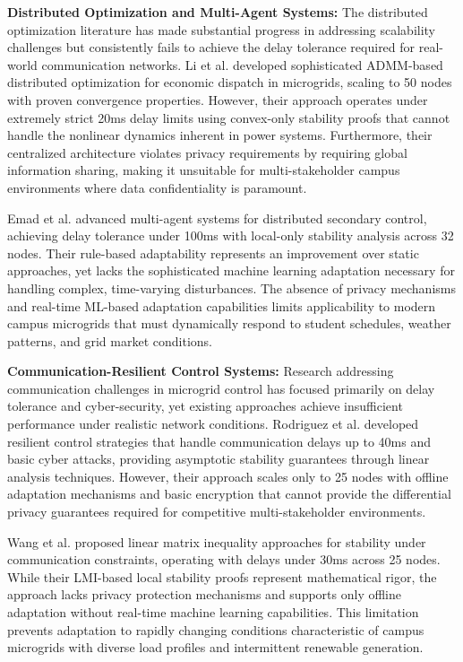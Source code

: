 \documentclass[12pt]{article}
\begin{document}
\textbf{Distributed Optimization and Multi-Agent Systems:} The distributed optimization literature has made substantial progress in addressing scalability challenges but consistently fails to achieve the delay tolerance required for real-world communication networks. Li et al. \cite{li2023} developed sophisticated ADMM-based distributed optimization for economic dispatch in microgrids, scaling to 50 nodes with proven convergence properties. However, their approach operates under extremely strict 20ms delay limits using convex-only stability proofs that cannot handle the nonlinear dynamics inherent in power systems. Furthermore, their centralized architecture violates privacy requirements by requiring global information sharing, making it unsuitable for multi-stakeholder campus environments where data confidentiality is paramount.

Emad et al. \cite{emad2024} advanced multi-agent systems for distributed secondary control, achieving delay tolerance under 100ms with local-only stability analysis across 32 nodes. Their rule-based adaptability represents an improvement over static approaches, yet lacks the sophisticated machine learning adaptation necessary for handling complex, time-varying disturbances. The absence of privacy mechanisms and real-time ML-based adaptation capabilities limits applicability to modern campus microgrids that must dynamically respond to student schedules, weather patterns, and grid market conditions.

\textbf{Communication-Resilient Control Systems:} Research addressing communication challenges in microgrid control has focused primarily on delay tolerance and cyber-security, yet existing approaches achieve insufficient performance under realistic network conditions. Rodriguez et al. \cite{rodriguez2022} developed resilient control strategies that handle communication delays up to 40ms and basic cyber attacks, providing asymptotic stability guarantees through linear analysis techniques. However, their approach scales only to 25 nodes with offline adaptation mechanisms and basic encryption that cannot provide the differential privacy guarantees required for competitive multi-stakeholder environments.

Wang et al. \cite{wang2025} proposed linear matrix inequality approaches for stability under communication constraints, operating with delays under 30ms across 25 nodes. While their LMI-based local stability proofs represent mathematical rigor, the approach lacks privacy protection mechanisms and supports only offline adaptation without real-time machine learning capabilities. This limitation prevents adaptation to rapidly changing conditions characteristic of campus microgrids with diverse load profiles and intermittent renewable generation.
\end{document}
